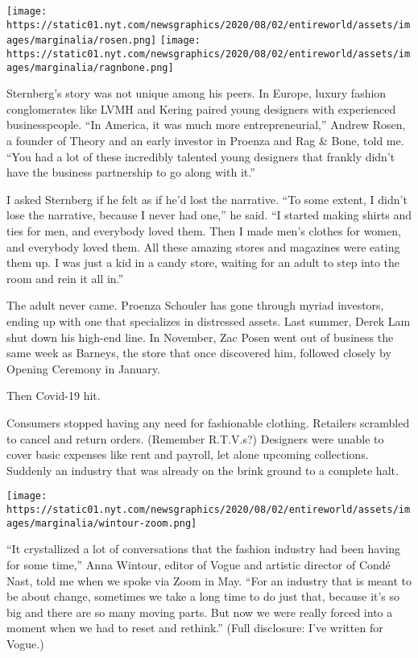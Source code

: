 \texttt{[image: https://static01.nyt.com/newsgraphics/2020/08/02/entireworld/assets/images/marginalia/rosen.png]}
\texttt{[image: https://static01.nyt.com/newsgraphics/2020/08/02/entireworld/assets/images/marginalia/ragnbone.png]}

Sternberg's story was not unique among his peers. In Europe, luxury
fashion conglomerates like LVMH and Kering paired young designers with
experienced businesspeople. ``In America, it was much more
entrepreneurial,'' Andrew Rosen, a founder of Theory and an early
investor in Proenza and Rag \& Bone, told me. ``You had a lot of these
incredibly talented young designers that frankly didn't have the
business partnership to go along with it.''

I asked Sternberg if he felt as if he'd lost the narrative. ``To some
extent, I didn't lose the narrative, because I never had one,'' he said.
``I started making shirts and ties for men, and everybody loved them.
Then I made men's clothes for women, and everybody loved them. All these
amazing stores and magazines were eating them up. I was just a kid in a
candy store, waiting for an adult to step into the room and rein it all
in.''

The adult never came. Proenza Schouler has gone through myriad
investors, ending up with one that specializes in distressed assets.
Last summer, Derek Lam shut down his high-end line. In November, Zac
Posen went out of business the same week as Barneys, the store that once
discovered him, followed closely by Opening Ceremony in January.

Then Covid-19 hit.

Consumers stopped having any need for fashionable clothing. Retailers
scrambled to cancel and return orders. (Remember R.T.V.s?) Designers
were unable to cover basic expenses like rent and payroll, let alone
upcoming collections. Suddenly an industry that was already on the brink
ground to a complete halt.

\texttt{[image: https://static01.nyt.com/newsgraphics/2020/08/02/entireworld/assets/images/marginalia/wintour-zoom.png]}

``It crystallized a lot of conversations that the fashion industry had
been having for some time,'' Anna Wintour, editor of Vogue and artistic
director of Condé Nast, told me when we spoke via Zoom in May. ``For an
industry that is meant to be about change, sometimes we take a long time
to do just that, because it's so big and there are so many moving parts.
But now we were really forced into a moment when we had to reset and
rethink.'' (Full disclosure: I've written for Vogue.)

